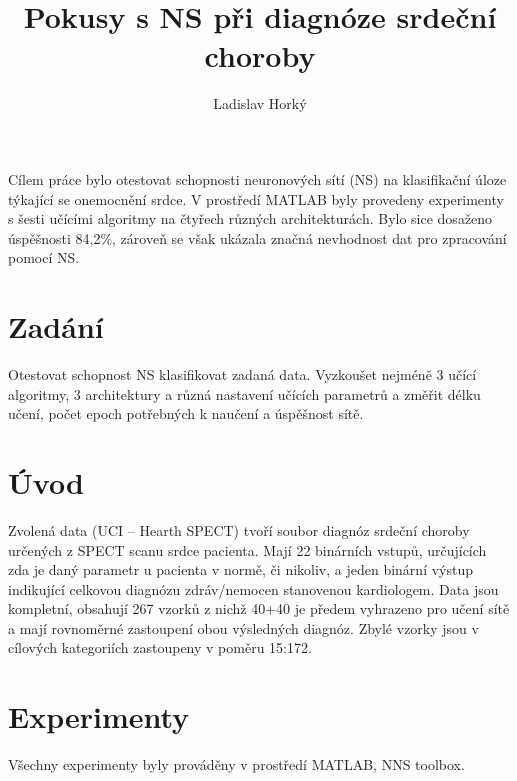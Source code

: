 \documentclass[journal]{IEEEtrancz}
\begin{document}
\title{Pokusy s NS při diagnóze srdeční choroby}
\author{Ladislav Horký}

\maketitle

\begin{abstrakt}
Cílem práce bylo otestovat schopnosti neuronových sítí (NS) na klasifikační úloze týkající se onemocnění srdce.
V prostředí MATLAB byly provedeny experimenty s šesti učícími algoritmy na čtyřech různých architekturách. 
Bylo sice dosaženo úspěšnosti 84,2\%, zároveň se však ukázala značná nevhodnost dat pro zpracování pomocí NS.

\end{abstrakt}

\IEEEpeerreviewmaketitle

\section{Zadání}
Otestovat schopnost NS klasifikovat zadaná data. Vyzkoušet nejméně 3 učící algoritmy, 3 architektury a různá nastavení učících parametrů a změřit délku učení, počet epoch potřebných k naučení a úspěšnost sítě.


\section{Úvod}
Zvolená data (UCI -- Hearth SPECT) tvoří soubor diagnóz srdeční choroby určených z SPECT scanu srdce pacienta. Mají 22 binárních vstupů, určujících zda je daný parametr u pacienta v normě, či nikoliv, a jeden binární výstup indikující celkovou diagnózu zdráv/nemocen stanovenou kardiologem. Data jsou kompletní, obsahují 267 vzorků z nichž 40+40 je předem vyhrazeno pro učení sítě a mají rovnoměrné zastoupení obou výsledných diagnóz. Zbylé vzorky jsou v cílových kategoriích zastoupeny v poměru 15:172.

\section{Experimenty}
Všechny experimenty byly prováděny v prostředí MATLAB, NNS toolbox.
\end{document}
